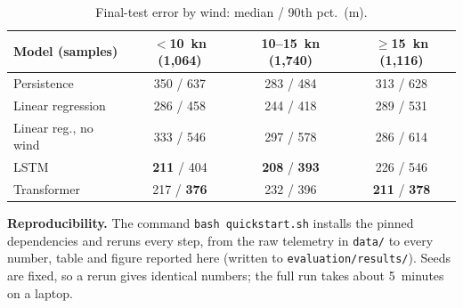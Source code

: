 \documentclass[sigconf]{acmart}
\begin{document}
\begin{table}[!ht]
\centering\footnotesize
\caption{Final-test error by wind: median / 90th pct.\ (m).}
\label{tab:wind}
\begin{tabular}{@{}lccc@{}}
\toprule
Model (samples) & $<$10~kn (1{,}064) & 10--15~kn (1{,}740) & $\geq$15~kn (1{,}116) \\
\midrule
Persistence & 350 / 637 & 283 / 484 & 313 / 628 \\
Linear regression & 286 / 458 & 244 / 418 & 289 / 531 \\
Linear reg., no wind & 333 / 546 & 297 / 578 & 286 / 614 \\
LSTM & \textbf{211} / 404 & \textbf{208} / \textbf{393} & 226 / 546 \\
Transformer & 217 / \textbf{376} & 232 / 396 & \textbf{211} / \textbf{378} \\
\bottomrule
\end{tabular}
\end{table}

\textbf{Reproducibility.} The command \texttt{bash quickstart.sh} installs the pinned dependencies and reruns every step, from the raw telemetry in \texttt{data/} to every number, table and figure reported here (written to \texttt{evaluation/results/}). Seeds are fixed, so a rerun gives identical numbers; the full run takes about 5~minutes on a laptop.




\end{document}
